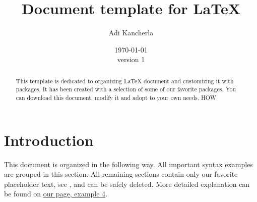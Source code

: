 \documentclass[a4paper]{article}
\begin{document}
\title{Document template for \LaTeX}
\author{Adi Kancherla}
\date{\today \\version 1}

\maketitle

\begin{abstract}
This template is dedicated to organizing \LaTeX{} document and customizing it
with packages. It has been created with a selection of some of our favorite
packages. You can download this document, modify it and adopt to your own
needs. HOW
\end{abstract}


\section{Introduction}\label{Sect:Introduction}
This document is organized in the following way. All important syntax examples
are grouped in this section. All remaining sections contain only our favorite
placeholder text, see \cite{LoremIpsum_wiki}, and can be safely deleted. More
detailed explanation can be found on
\href{http://www.electronics.oulu.fi/latex/examples/example_4/index.html}{our
page, example 4}.
\end{document}
